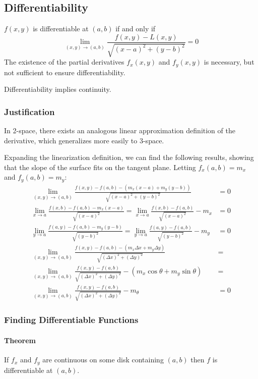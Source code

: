 \documentclass{article}
\begin{document}
\subsection{Differentiability}
$f(x,y)$ is differentiable at $(a,b)$ if and only if
\[
	\lim_{(x,y)\to(a,b)} \frac{f(x,y) - L(x,y)}{\sqrt{(x-a)^2 + (y-b)^2}} = 0
\]
The existence of the partial derivatives $f_x(x,y)$ and $f_y(x,y)$ is necessary, but not sufficient to ensure differentiability.

Differentiability implies continuity.

\subsubsection{Justification}
In 2-space, there exists an analogous linear approximation definition of the derivative, which generalizes more easily to 3-space.

Expanding the linearization definition, we can find the following results, showing that the slope of the surface fits on the tangent plane. Letting $f_x(a,b) = m_x$ and $f_y(a,b) = m_y$:
\begin{align*}
	\lim_{(x,y)\to(a,b)} \frac{f(x,y) - f(a,b) - (m_x(x - a) + m_y(y - b))}{\sqrt{(x-a)^2+(y-b)^2}} &= 0\\
	\lim_{x\to a} \frac{f(x,b) - f(a,b) - m_x(x - a)}{\sqrt{(x-a)^2}} =
	 \lim_{x\to a} \frac{f(x,b) - f(a,b)}{\sqrt{(x-a)^2}} - m_x &= 0\\
	\lim_{y\to a} \frac{f(a,y) - f(a,b) - m_y(y - b)}{\sqrt{(y-b)^2}} =
	 \lim_{y\to a} \frac{f(a,y) - f(a,b)}{\sqrt{(y-b)^2}} - m_y &= 0\\
	\lim_{(x,y)\to(a,b)} \frac{f(x,y) - f(a,b) - (m_x\Delta{x} + m_y\Delta{y})}{\sqrt{(\Delta{x})^2+(\Delta{y})^2}} &=\\
	 \lim_{(x,y)\to(a,b)} \frac{f(x,y) - f(a,b)}{\sqrt{(\Delta{x})^2+(\Delta{y})^2}} - (m_x\cos{\theta} + m_y\sin{\theta}) &=\\
	 \lim_{(x,y)\to(a,b)} \frac{f(x,y) - f(a,b)}{\sqrt{(\Delta{x})^2+(\Delta{y})^2}} - m_\theta &= 0
\end{align*}


\subsubsection{Finding Differentiable Functions}
\paragraph{Theorem} If $f_x$ and $f_y$ are continuous on some disk containing $(a,b)$ then $f$ is differentiable at $(a,b)$.
\end{document}
